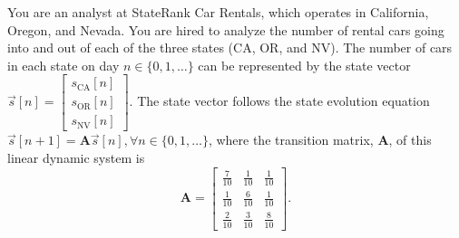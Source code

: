 

\newcommand{\stateRankTransMatrix}{\ensuremath{\begin{bmatrix}
\frac{7}{10} & \frac{1}{10} & \frac{1}{10} \\
\frac{1}{10} & \frac{6}{10} & \frac{1}{10} \\
\frac{2}{10} & \frac{3}{10} & \frac{8}{10}
\end{bmatrix}}}


You are an analyst at StateRank Car Rentals, which operates in California, Oregon, and Nevada.
You are hired to analyze the number of rental cars going into and out of each of the three states (CA, OR, and NV).
The number of cars in each state on day $n \in \{0,1,\ldots\}$ can be represented by the state vector $\vec{s}[n] = \begin{bmatrix} s_\text{CA}[n] \\ s_\text{OR}[n] \\ s_\text{NV}[n] \end{bmatrix}$.
The state vector follows the state evolution equation $\vec{s}[n+1] = \mathbf{A}\vec{s}[n], \forall n \in \{0,1,\ldots\}$, where the transition matrix, $\mathbf{A}$, of this linear dynamic system is
\[
\mathbf{A} = 
\stateRankTransMatrix.
\]

